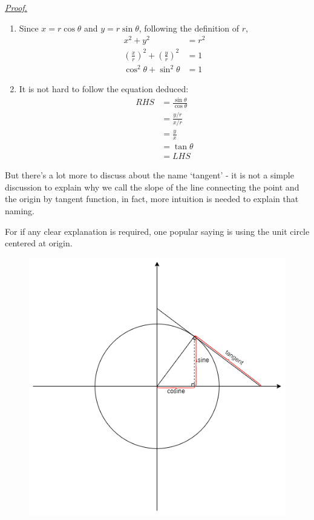 \documentclass[12pt]{article}
\renewenvironment{proof}[1][Proof]{\begin{snugshade*} \underline{\textit{{#1}.}}\\}{\hfill \qedsymbol \end{snugshade*}}
\begin{document}
    \begin{proof}
        \begin{enumerate}
            \item Since $x=r\cos{\theta}$ and $y=r\sin{\theta}$, following the definition of $r$, \begin{align*}
                x^2+y^2&=r^2\\
                (\frac{x}{r})^2+(\frac{y}{r})^2&=1\\
                \cos^2{\theta}+\sin^2{\theta}&=1
            \end{align*}
            \item It is not hard to follow the equation deduced:\begin{align*}
                RHS&=\frac{\sin{\theta}}{\cos{\theta}}\\
                &=\frac{y/r}{x/r}\\
                &=\frac{y}{x}\\
                &=\tan{\theta}\\
                &=LHS
            \end{align*}
        \end{enumerate}
    \end{proof}

    But there's a lot more to discuss about the name `tangent' - it is not a simple discussion to explain why we call the slope of the line connecting the point and the origin by tangent function, in fact, more intuition is needed to explain that naming.

    For if any clear explanation is required, one popular saying is using the unit circle centered at origin.

    \begin{figure}[H]
        \centering
        \includegraphics[scale=0.8]{trigo_on_circle.png}
    \end{figure}
\end{document}
